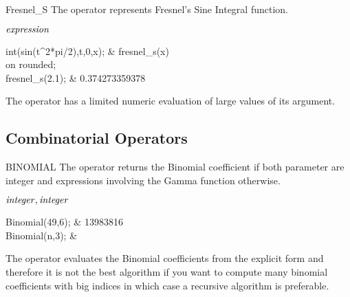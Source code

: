 \begin{Operator}{Fresnel_S}
The  operator represents Fresnel's Sine Integral function.

\begin{Syntax}
\(\meta{expression}\)
\end{Syntax}

\begin{Examples}
int(sin(t^2*pi/2),t,0,x);     &   fresnel\_s(x) \\
on rounded; \\
fresnel_s(2.1);                  &   0.374273359378
\end{Examples}

\begin{Comments}
The operator  has a limited numeric evaluation of 
large values of its argument.
\end{Comments}
\end{Operator}

\subsection{Combinatorial Operators}

\begin{Operator}{BINOMIAL}
The  operator returns the Binomial coefficient if both
parameter are integer and expressions involving the Gamma function otherwise.

\begin{Syntax}

\(\meta{integer},\meta{integer}\)

\end{Syntax}

\begin{Examples}
Binomial(49,6);                &  13983816 \\

Binomial(n,3);                 &  
\end{Examples}

\begin{Comments}
The operator  evaluates the Binomial coefficients from 
the explicit form and therefore it is not the best algorithm if you
want to compute many binomial coefficients with big indices in which
case a recursive algorithm is preferable.
\end{Comments}
\end{Operator}

